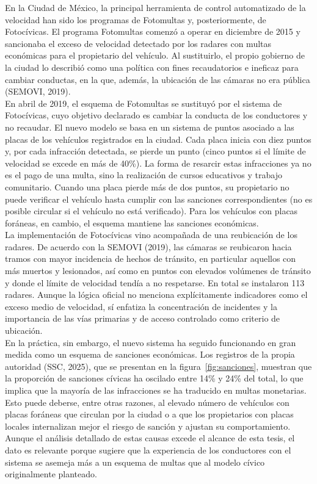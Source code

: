 \indent En la Ciudad de México, la principal herramienta de control automatizado de la velocidad han sido los programas de Fotomultas y, posteriormente, de Fotocívicas. El programa Fotomultas comenzó a operar en diciembre de 2015 y sancionaba el exceso de velocidad detectado por los radares con multas económicas para el propietario del vehículo. Al sustituirlo, el propio gobierno de la ciudad lo describió como una política con fines recaudatorios e ineficaz para cambiar conductas, en la que, además, la ubicación de las cámaras no era pública (SEMOVI, 2019).\\

En abril de 2019, el esquema de Fotomultas se sustituyó por el sistema de Fotocívicas, cuyo objetivo declarado es cambiar la conducta de los conductores y no recaudar. El nuevo modelo se basa en un sistema de puntos asociado a las placas de los vehículos registrados en la ciudad. Cada placa inicia con diez puntos y, por cada infracción detectada, se pierde un punto (cinco puntos si el límite de velocidad se excede en más de 40\%). La forma de resarcir estas infracciones ya no es el pago de una multa, sino la realización de cursos educativos y trabajo comunitario. Cuando una placa pierde más de dos puntos, su propietario no puede verificar el vehículo hasta cumplir con las sanciones correspondientes (no es posible circular si el vehículo no está verificado). Para los vehículos con placas foráneas, en cambio, el esquema mantiene las sanciones económicas.\\

La implementación de Fotocívicas vino acompañada de una reubicación de los radares. De acuerdo con la SEMOVI (2019), las cámaras se reubicaron hacia tramos con mayor incidencia de hechos de tránsito, en particular aquellos con más muertos y lesionados, así como en puntos con elevados volúmenes de tránsito y donde el límite de velocidad tendía a no respetarse. En total se instalaron 113 radares. Aunque la lógica oficial no menciona explícitamente indicadores como el exceso medio de velocidad, sí enfatiza la concentración de incidentes y la importancia de las vías primarias y de acceso controlado como criterio de ubicación.\\

En la práctica, sin embargo, el nuevo sistema ha seguido funcionando en gran medida como un esquema de sanciones económicas. Los registros de la propia autoridad (SSC, 2025), que se presentan en la figura~\ref{fig:sanciones}, muestran que la proporción de sanciones cívicas ha oscilado entre 14\% y 24\% del total, lo que implica que la mayoría de las infracciones se ha traducido en multas monetarias. Esto puede deberse, entre otras razones, al elevado número de vehículos con placas foráneas que circulan por la ciudad o a que los propietarios con placas locales internalizan mejor el riesgo de sanción y ajustan su comportamiento. Aunque el análisis detallado de estas causas excede el alcance de esta tesis, el dato es relevante porque sugiere que la experiencia de los conductores con el sistema se asemeja más a un esquema de multas que al modelo cívico originalmente planteado.\\

